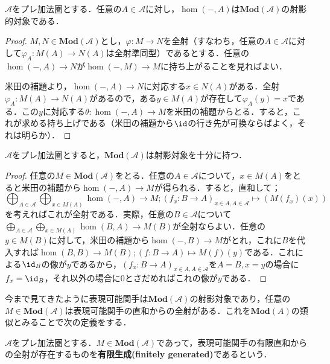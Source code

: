 \begin{lem}
	$\mathscr{A}$をプレ加法圏とする．任意の$A\in\mathscr{A}$に対し，$\hom(-,A)$は$\mathbf{Mod}(\mathscr{A})$の射影的対象である．
\end{lem}

\begin{proof}
	$M,N\in\mathbf{Mod}(\mathscr{A})$とし，$\varphi:M\to N$を全射（すなわち，任意の$A\in\mathscr{A}$に対して$\varphi_A:M(A)\to N(A)$は全射準同型）であるとする．任意の$\hom(-,A)\to N$が$\hom(-,M)\to M$に持ち上がることを見ればよい．
	
	米田の補題より，$\hom(-,A)\to N$に対応する$x\in N(A)$がある．全射$\varphi_A:M(A)\to N(A)$があるので，ある$y\in M(A)$が存在して$\varphi_A(y)=x$である．この$y$に対応する$\theta:\hom(-,A)\to M$を米田の補題からとる．すると，これが求める持ち上げである（米田の補題から$\id$の行き先が可換ならばよく，それは明らか）．
\end{proof}

\begin{thm}
	$\mathscr{A}$をプレ加法圏とすると，$\mathbf{Mod}(\mathscr{A})$は射影対象を十分に持つ．
\end{thm}

\begin{proof}
	任意の$M\in\mathbf{Mod}(\mathscr{A})$をとる．任意の$A\in\mathscr{A}$について，$x\in M(A)$をとると米田の補題から$\hom(-,A)\to M$が得られる．すると，直和して；
	\[\bigoplus_{A\in\mathscr{A}}\bigoplus_{x\in M(A)}\hom(-,A)\to M;(f_x:B\to A)_{x\in A, A\in\mathscr{A}}\mapsto (M(f_x)(x))\]
	を考えればこれが全射である．実際，任意の$B\in\mathscr{A}$について$\bigoplus_{A\in\mathscr{A}}\bigoplus_{x\in M(A)}\hom(B,A)\to M(B)$が全射ならよい．任意の$y\in M(B)$に対して，米田の補題から$\hom(-,B)\to M$がとれ，これに$B$を代入すれば$\hom(B,B)\to M(B);(f:B\to A)\mapsto M(f)(y)$である．これによる$\id_B$の像が$y$であるから，$(f_x:B\to A)_{x\in A, A\in\mathscr{A}}$を$A=B,x=y$の場合に$f_x=\id_B$，それ以外の場合に0とさだめればこれの像が$y$である．
\end{proof}

今まで見てきたように表現可能関手は$\mathbf{Mod}(\mathscr{A})$の射影対象であり，任意の$M\in\mathbf{Mod}(\mathscr{A})$は表現可能関手の直和からの全射がある．これを$\mathbf{Mod}(A)$の類似とみることで次の定義をする．

\begin{defi}
	$\mathscr{A}$をプレ加法圏とする．$M\in\mathbf{Mod}(\mathscr{A})$であって，表現可能関手の有限直和からの全射が存在するものを\textbf{有限生成(finitely generated)}であるという．
\end{defi}

